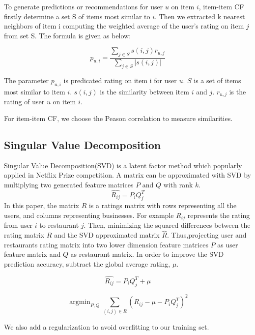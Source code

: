 \documentclass{llncs}
\DeclareMathOperator*{\argmin}{argmin}
\begin{document}
To generate predictions or recommendations for user $u$ on item $i$, item-item CF firstly determine a set S of items most similar to $i$. Then we extracted k nearest neighbors of item i computing the weighted average of the user's rating on item $j$ from set S. The formula is given as below:

\begin{equation}
p_{u,i} =\frac
{\sum\nolimits_{j \in S} s(i,j)r_{u,j}} 
{\sum\nolimits_{j \in S} |s(i,j)|}
\end{equation}

The parameter $p_{u,i}$ is predicated rating on item i for user $u$. $S$ is a set of items most similar to item $i$. $s(i,j)$ is the similarity between item $i$ and $j$. $r_{u,j}$ is the rating of user $u$ on item $i$.

For item-item CF, we choose the Peason correlation to measure similarities. 


\subsection{Singular Value Decomposition}
Singular Value Decomposition(SVD) is a latent factor method which popularly applied in Netflix Prize competition. A matrix can be approximated with SVD by multiplying two generated feature matrices $P$ and $Q$ with rank $k$.
\begin{equation}
\hat{R_{ij}} = P_iQ_{j}^{T}
\end{equation}
In this paper, the matrix $R$ is a ratings matrix with rows representing all the users, and columns representing businesses. For example $R_{ij}$ represents the rating from user $i$ to restaurant $j$. Then, minimizing the squared differences between the rating matrix $R$ and the SVD approximated matrix $\hat{R}$. Thus,projecting user and restaurants rating matrix into two lower dimension feature matrices $P$ as user feature matrix and $Q$ as restaurant matrix. In order to improve the SVD prediction accuracy, subtract the global average rating, $\mu$.

\begin{equation}
\hat{R_{ij}} = P_iQ_{j}^{T} + \mu
\end{equation}

\begin{equation}
\argmin_{P,Q}\sum_{(i,j)\in{R}}{(R_{ij} - \mu - P_iQ_{j}^{T})}^2
\end{equation}

We also add a regularization to avoid overfitting to our training set.
\end{document}
